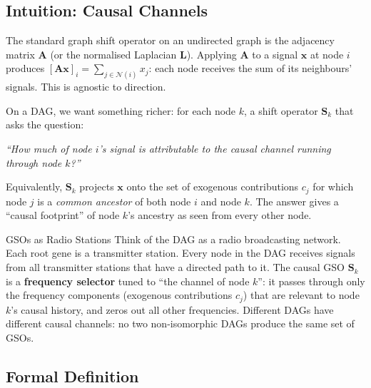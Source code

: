 \subsection{Intuition: Causal Channels}

The standard graph shift operator on an undirected graph is the adjacency
matrix $\mathbf{A}$ (or the normalised Laplacian $\mathbf{L}$). Applying
$\mathbf{A}$ to a signal $\mathbf{x}$ at node $i$ produces
$[\mathbf{A}\mathbf{x}]_i = \sum_{j \in \mathcal{N}(i)} x_j$: each node
receives the sum of its neighbours' signals. This is agnostic to direction.

On a DAG, we want something richer: for each node $k$, a shift operator
$\mathbf{S}_k$ that asks the question:

\begin{center}
\emph{``How much of node $i$'s signal is attributable to the causal channel
running through node $k$?''}
\end{center}

Equivalently, $\mathbf{S}_k$ projects $\mathbf{x}$ onto the set of exogenous
contributions $c_j$ for which node $j$ is a \emph{common ancestor} of both
node $i$ and node $k$. The answer gives a ``causal footprint'' of node $k$'s
ancestry as seen from every other node.

\begin{analogybox}{GSOs as Radio Stations}
Think of the DAG as a radio broadcasting network. Each root gene is a
transmitter station. Every node in the DAG receives signals from all transmitter
stations that have a directed path to it. The causal GSO $\mathbf{S}_k$
is a \textbf{frequency selector} tuned to ``the channel of node $k$'': it
passes through only the frequency components (exogenous contributions $c_j$)
that are relevant to node $k$'s causal history, and zeros out all other
frequencies. Different DAGs have different causal channels: no two
non-isomorphic DAGs produce the same set of GSOs.
\end{analogybox}

\subsection{Formal Definition}

